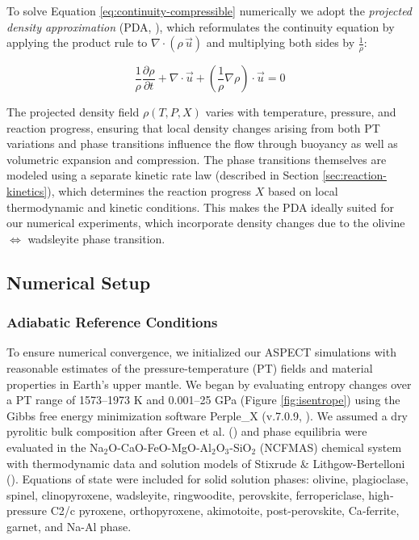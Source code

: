 \documentclass[
  paper=a4,
  ,captions=tableheading
]{scrartcl}
\begin{document}
To solve Equation \ref{eq:continuity-compressible} numerically we adopt
the \emph{projected density approximation} (PDA,
), which
reformulates the continuity equation by applying the product rule to
\(\nabla \cdot (\rho\, \vec{u})\) and multiplying both sides by
\(\frac{1}{\rho}\):

\begin{equation}
  \frac{1}{\rho} \frac{\partial \rho}{\partial t} + \nabla \cdot \vec{u} + \left(\frac{1}{\rho} \nabla \rho \right) \cdot \vec{u} = 0
  \label{eq:continuity-expanded}
\end{equation}

The projected density field \(\rho(T, P, X)\) varies with temperature,
pressure, and reaction progress, ensuring that local density changes
arising from both PT variations and phase transitions influence the flow
through buoyancy as well as volumetric expansion and compression. The
phase transitions themselves are modeled using a separate kinetic rate
law (described in Section \ref{sec:reaction-kinetics}), which determines
the reaction progress \(X\) based on local thermodynamic and kinetic
conditions. This makes the PDA ideally suited for our numerical
experiments, which incorporate density changes due to the olivine
\(\Leftrightarrow\) wadsleyite phase transition.

\subsection{Numerical Setup}\label{sec:numerical-setup}

\subsubsection{Adiabatic Reference
Conditions}\label{sec:adiabatic-reference-conditions}

To ensure numerical convergence, we initialized our ASPECT simulations
with reasonable estimates of the pressure-temperature (PT) fields and
material properties in Earth's upper mantle. We began by evaluating
entropy changes over a PT range of 1573--1973 K and 0.001--25 GPa
(Figure \ref{fig:isentrope}) using the Gibbs free energy minimization
software Perple\_X (v.7.0.9, ). We assumed a dry pyrolitic bulk composition after Green et al.
() and phase equilibria were evaluated in
the Na\(_2\)O-CaO-FeO-MgO-Al\(_2\)O\(_3\)-SiO\(_2\) (NCFMAS) chemical
system with thermodynamic data and solution models of Stixrude \&
Lithgow-Bertelloni (). Equations of
state were included for solid solution phases: olivine, plagioclase,
spinel, clinopyroxene, wadsleyite, ringwoodite, perovskite,
ferropericlase, high‐pressure C2/c pyroxene, orthopyroxene, akimotoite,
post‐perovskite, Ca‐ferrite, garnet, and Na-Al phase.
\end{document}
